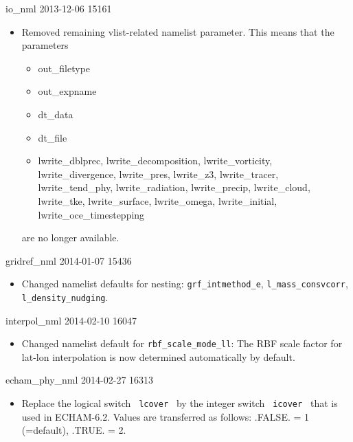 \begin{changeitem}{io\_nml }{ 2013-12-06 }{ 15161 }
  \begin{itemize}
   \item Removed remaining vlist-related namelist parameter. This means that the parameters
         \begin{itemize}
            \item out\_filetype
            \item out\_expname
            \item dt\_data
            \item dt\_file
            \item lwrite\_dblprec, lwrite\_decomposition, lwrite\_vorticity, lwrite\_divergence, lwrite\_pres,
                  lwrite\_z3, lwrite\_tracer, lwrite\_tend\_phy, lwrite\_radiation, lwrite\_precip, lwrite\_cloud,
                  lwrite\_tke, lwrite\_surface, lwrite\_omega, lwrite\_initial, lwrite\_oce\_timestepping
         \end{itemize}
         are no longer available.
  \end{itemize}
\end{changeitem}

\begin{changeitem}{gridref\_nml}{ 2014-01-07 }{ 15436 }
  \begin{itemize}
   \item Changed namelist defaults for nesting: \texttt{grf\_intmethod\_e}, \texttt{l\_mass\_consvcorr}, \texttt{l\_density\_nudging}.
  \end{itemize}
\end{changeitem}


\begin{changeitem}{interpol\_nml}{ 2014-02-10 }{ 16047 }
  \begin{itemize}
   \item Changed namelist default for \texttt{rbf\_scale\_mode\_ll}: The RBF scale factor for lat-lon interpolation is now
      determined automatically by default.
  \end{itemize}
\end{changeitem}


\begin{changeitem}{echam\_phy\_nml}{ 2014-02-27 }{ 16313 }
  \begin{itemize}
   \item Replace the logical switch \texttt{ lcover } by the integer switch \texttt{ icover } that is used in ECHAM-6.2. Values are transferred as follows: .FALSE. = 1 (=default), .TRUE. = 2.
  \end{itemize}
\end{changeitem}

